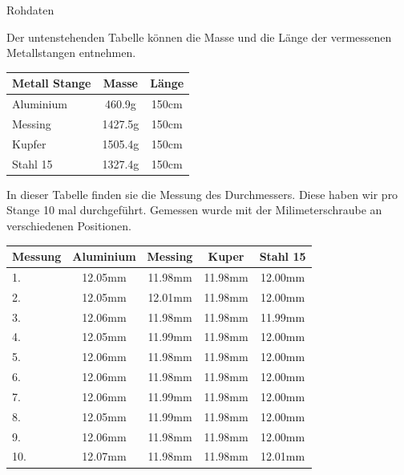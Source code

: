 \documentclass[twoside]{protokoll}
\begin{document}
\begin{aufgabe}{Rohdaten}

Der untenstehenden Tabelle können die Masse und die Länge der vermessenen Metallstangen entnehmen.  
    \begin{table}[H]
        \centering
        \begin{tabularx}{0.8\textwidth}{X c c} %
            \toprule
            \textbf{Metall Stange} & \textbf{Masse} & \textbf{Länge} \\
            \midrule
            Aluminium & 460.9g & 150cm \\
            Messing & 1427.5g & 150cm \\
            Kupfer & 1505.4g & 150cm \\
            Stahl 15 & 1327.4g & 150cm \\
            \bottomrule
        \end{tabularx}
        \label{tab:mytable}
    \end{table}

In dieser Tabelle finden sie die Messung des Durchmessers. Diese haben wir pro Stange 10 mal durchgeführt. Gemessen wurde mit der Milimeterschraube an verschiedenen Positionen.
    \begin{table}[H]
        \centering
        \begin{tabularx}{0.8\textwidth}{X c c c c} %
            \toprule
            \textbf{Messung} & \textbf{Aluminium} & \textbf{Messing} & \textbf{Kuper} & \textbf{Stahl 15} \\
            \midrule
            1. & 12.05mm & 11.98mm & 11.98mm & 12.00mm \\
            2. & 12.05mm & 12.01mm & 11.98mm & 12.00mm \\
            3. & 12.06mm & 11.98mm & 11.98mm & 11.99mm \\
            4. & 12.05mm & 11.99mm & 11.98mm & 12.00mm \\
            5. & 12.06mm & 11.98mm & 11.98mm & 12.00mm \\
            6. & 12.06mm & 11.98mm & 11.98mm & 12.00mm \\
            7. & 12.06mm & 11.99mm & 11.98mm & 12.00mm \\
            8. & 12.05mm & 11.99mm & 11.98mm & 12.00mm \\
            9. & 12.06mm & 11.98mm & 11.98mm & 12.00mm \\
            10.& 12.07mm & 11.98mm & 11.98mm & 12.01mm \\
            \bottomrule
        \end{tabularx}
        \label{tab:mytable}
    \end{table}


\end{aufgabe}
\end{document}
